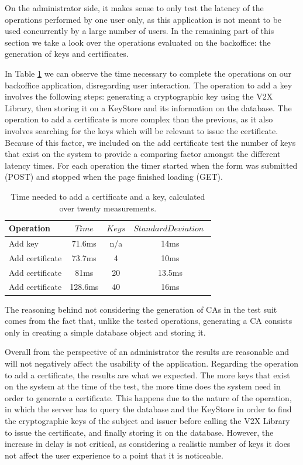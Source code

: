 On the administrator side, it makes sense to only test the latency of the operations performed by one user only, as this application is not meant to be used concurrently by a large number of users. In the remaining part of this section we take a look over the operations evaluated on the backoffice: the generation of keys and certificates. 

In Table \ref{tab:table1} we can observe the time necessary to complete the operations on our backoffice application, disregarding user interaction. The operation to add a key involves the following steps: generating a cryptographic key using the V2X Library, then storing it on a KeyStore and its information on the database. The operation to add a certificate is more complex than the previous, as it also involves searching for the keys which will be relevant to issue the certificate. Because of this factor, we included on the add certificate test the number of keys that exist on the system to provide a comparing factor amongst the different latency times. For each operation the timer started when the form was submitted (POST) and stopped when the page finished loading (GET).

\begin{table}[!htb]
	\renewcommand{\arraystretch}{1.2} %
	\centering
	\begin{tabular}{lccc}
		\toprule
		Operation           & $Time$ & $Keys$& $StandardDeviation$ $$\\
		\midrule
		Add key          & 71.6ms & n/a & 14ms   \\
		Add certificate  & 73.7ms &4& 10ms     \\
		Add certificate  & 81ms &20& 13.5ms     \\
		Add certificate  & 128.6ms &40& 16ms     \\
		\bottomrule
	\end{tabular}
	
	\caption[time]{Time needed to add a certificate and a key, calculated over twenty measurements.}
	\label{tab:table1}
\end{table}

The reasoning behind not considering the generation of CAs in the test suit comes from the fact that, unlike the tested operations, generating a CA consists only in creating a simple database object and storing it. 

Overall from the perspective of an administrator the results are reasonable and will not negatively affect the usability of the application. Regarding the operation to add a certificate, the results are what we expected. The more keys that exist on the system at the time of the test, the more time does the system need in order to generate a certificate. This happens due to the nature of the operation, in which the server has to query the database and the KeyStore in order to find the cryptographic keys of the subject and issuer before calling the V2X Library to issue the certificate, and finally storing it on the database. However, the increase in delay is not critical, as considering a realistic number of keys it does not affect the user experience to a point that it is noticeable.

